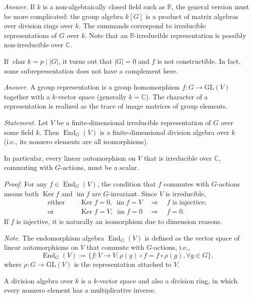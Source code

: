 \documentclass{mathproblems}
\newcommand\R{\mathbb{R}}
\newcommand\C{\mathbb{C}}
\newcommand\GL{\mathrm{GL}}
\DeclareMathOperator{\Ker}{Ker}
\DeclareMathOperator{\End}{End}
\begin{document}
\begin{questions}
\textit{Answer.} If $k$ is a non-algebraically closed field such as $\R$, the general version must be more complicated: the group algebra $k[G]$ is a product of matrix algebras over division rings over $k$. The summands correspond to irreducible representations of $G$ over $k$. Note that an $\R$-irreducible representation is possibly non-irreducible over $\C$.

If $\operatorname{char} k=p\mid |G|$, it turns out that $|G|=0$ and $f$ is not constructible. In fact, some subrepresentation does not have a complement here.


\textit{Answer.} A group representation is a group homomorphism $f: G\to \GL(V)$ together with a $k$-vector space (generally $k=\C$). The character of a representation is realized as the trace of image matrices of group elements.



{\color{violet}
\textit{Statement.} Let $V$ be a finite-dimensional irreducible representation of $G$ over some field $k$. Then $\End_G(V)$ is a finite-dimensional division algebra over $k$ (i.e., its nonzero elements are all isomorphisms).

In particular, every linear automorphism on $V$ that is irreducible over $\C$, commuting with $G$-actions, must be a scalar.}

\textit{Proof.} For any $f\in \End_G(V)$, the condition that $f$ commutes with $G$-actions means both $\Ker f$ and $\operatorname{im} f$ are $G$-invariant. Since $V$ is irreducible,
$$
\begin{aligned}
\text{either }\quad & \Ker f=0,\ \operatorname{im} f=V \quad \Longrightarrow \quad f \text{ is injective;}\\
\text{or }\quad & \Ker f=V,\ \operatorname{im} f=0 \quad \Longrightarrow \quad f=0.
\end{aligned}
$$
If $f$ is injective, it is naturally an isomorphism due to dimension reasons.

\textit{Note.} The endomorphism algebra $\End_G(V)$ is defined as the vector space of linear automorphisms on $V$ that commute with $G$-actions, i.e.,
$$
\End_G(V):=\{f:V\to V: \rho(g)\circ f=f\circ \rho(g), \forall g\in G\}.
$$
where $\rho: G\to \GL(V)$ is the representation attached to $V$.

A division algebra over $k$ is a $k$-vector space and also a division ring, in which every nonzero element has a multiplicative inverse.


\end{questions}
\end{document}
